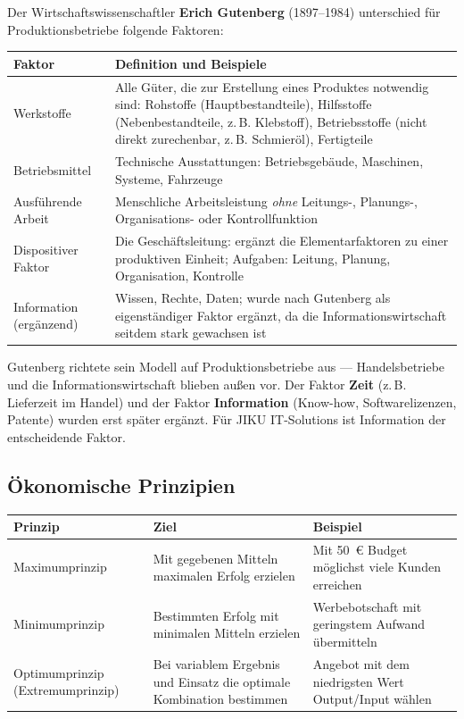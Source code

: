 \documentclass[11pt, a4paper]{article}
\begin{document}
Der Wirtschaftswissenschaftler \textbf{Erich Gutenberg} (1897--1984) unterschied für
Produktionsbetriebe folgende Faktoren:

\begin{center}
\begin{tabular}{p{3.5cm} p{9.5cm}}
\toprule
\textbf{Faktor} & \textbf{Definition und Beispiele}\\
\midrule
Werkstoffe & Alle Güter, die zur Erstellung eines Produktes notwendig sind: Rohstoffe (Hauptbestandteile), Hilfsstoffe (Nebenbestandteile, z.\,B. Klebstoff), Betriebsstoffe (nicht direkt zurechenbar, z.\,B. Schmieröl), Fertigteile\\
\addlinespace
Betriebsmittel & Technische Ausstattungen: Betriebsgebäude, Maschinen, Systeme, Fahrzeuge\\
\addlinespace
Ausführende Arbeit & Menschliche Arbeitsleistung \emph{ohne} Leitungs-, Planungs-, Organisations- oder Kontrollfunktion\\
\addlinespace
Dispositiver Faktor & Die Geschäftsleitung: ergänzt die Elementarfaktoren zu einer produktiven Einheit; Aufgaben: Leitung, Planung, Organisation, Kontrolle\\
\addlinespace
Information (ergänzend) & Wissen, Rechte, Daten; wurde nach Gutenberg als eigenständiger Faktor ergänzt, da die Informationswirtschaft seitdem stark gewachsen ist\\
\bottomrule
\end{tabular}
\end{center}

\begin{merksatz}[title={\bfseries Merke: Grenzen des Gutenberg-Modells}]
Gutenberg richtete sein Modell auf Produktionsbetriebe aus --- Handelsbetriebe und die
Informationswirtschaft blieben außen vor. Der Faktor \textbf{Zeit} (z.\,B. Lieferzeit im
Handel) und der Faktor \textbf{Information} (Know-how, Softwarelizenzen, Patente) wurden
erst später ergänzt. Für JIKU IT-Solutions ist Information der entscheidende Faktor.
\end{merksatz}

\subsection{Ökonomische Prinzipien}

\begin{center}
\begin{tabular}{p{3cm} p{5.5cm} p{4cm}}
\toprule
\textbf{Prinzip} & \textbf{Ziel} & \textbf{Beispiel}\\
\midrule
Maximumprinzip & Mit gegebenen Mitteln maximalen Erfolg erzielen & Mit 50~€ Budget möglichst viele Kunden erreichen\\
\addlinespace
Minimumprinzip & Bestimmten Erfolg mit minimalen Mitteln erzielen & Werbebotschaft mit geringstem Aufwand übermitteln\\
\addlinespace
Optimumprinzip (Extremum\-prinzip) & Bei variablem Ergebnis und Einsatz die optimale Kombination bestimmen & Angebot mit dem niedrigsten Wert Output/Input wählen\\
\bottomrule
\end{tabular}
\end{center}
\end{document}
